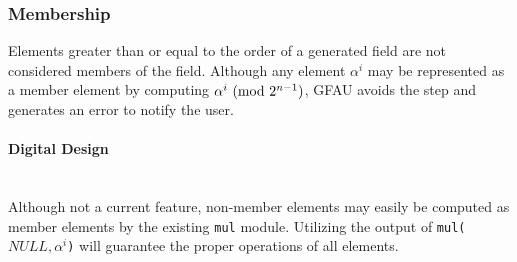 \subsubsection{Membership} Elements greater than or equal to the order of a
generated field are not considered members of the field. Although any element
$\alpha^i$ may be represented as a member element by computing $\alpha^i
\ (\mathrm{mod}\ 2^{n-1})$, GFAU avoids the step and generates an error to notify the user.

\paragraph{{\small Digital Design}} \leavevmode \\ Although not a current
feature, non-member elements may easily be computed as member elements by the
existing \texttt{mul} module. Utilizing the output of \texttt{mul($NULL, \alpha^i$)} will guarantee the proper operations of all elements.
